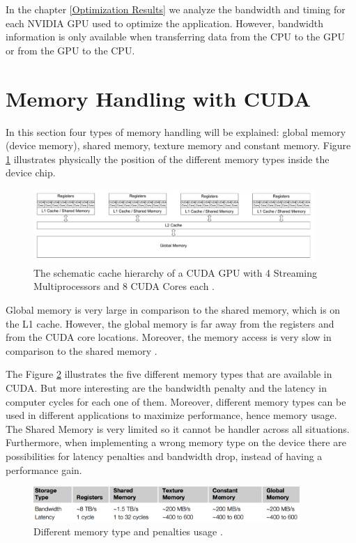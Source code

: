  In the chapter \ref{Optimization Results} we analyze the bandwidth and timing for each NVIDIA GPU used to optimize the application. However, bandwidth information is only available when transferring data from the CPU to the GPU or from the GPU to the CPU.

\section{Memory Handling with CUDA}

In this section four types of memory handling will be explained: global memory (device memory), shared memory, texture memory and constant memory. Figure \ref{fig:cores} illustrates physically the position of the different memory types inside the device chip.

\begin{figure}[htbp]
	\centering
		\includegraphics[width=0.95\textwidth]{Figures/cores.png}
		\smallskip
	\caption[Schematic cache hierarchy of a GPU]{The schematic cache hierarchy of a CUDA GPU with 4 Streaming Multiprocessors and 8 CUDA Cores each \cite{cook}.}
	\label{fig:cores}
\end{figure}

Global memory is very large in comparison to the shared memory, which is on the L1 cache. However, the global memory is far away from the registers and from the CUDA core locations. Moreover, the memory access is very slow in comparison to the shared memory \cite{cook}.

The Figure \ref{fig:memory} illustrates the five different memory types that are available in CUDA. But more interesting are the bandwidth penalty and the latency in computer cycles for each one of them. Moreover, different memory types can be used in different applications to maximize performance, hence memory usage. The Shared Memory is very limited so it cannot be handler across all situations. Furthermore, when implementing a wrong memory type on the device there are possibilities for latency penalties and bandwidth drop, instead of having a performance gain.
 
\begin{figure}[htbp]
	\centering
		\includegraphics[width=0.9\textwidth]{Figures/memory.png}
		\smallskip
	\caption[Different CUDA memory types]{Different memory type and penalties usage \cite{cook}.}
	\label{fig:memory}
\end{figure}

